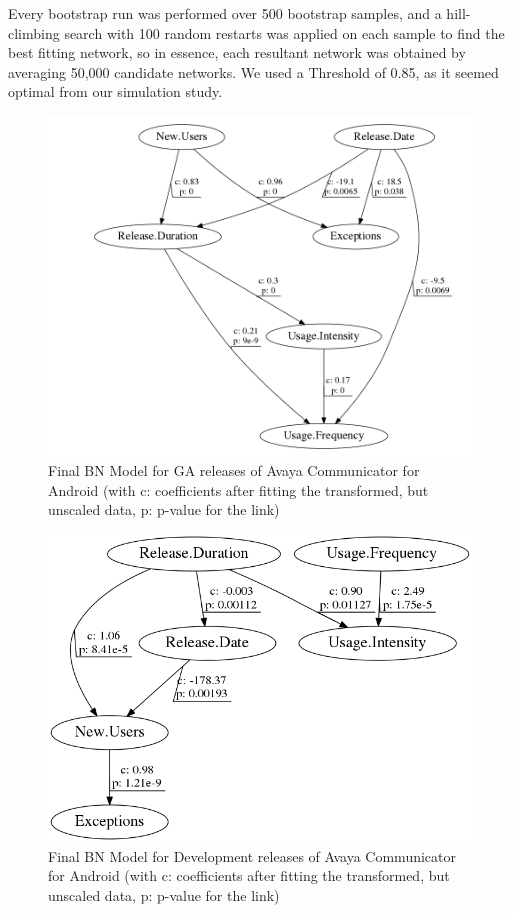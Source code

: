 \documentclass[smallextended]{svjour3}       %
\begin{document}
Every bootstrap run was performed over 500 bootstrap samples, and a
hill-climbing search  with 100 random restarts was applied on each sample 
to find the best fitting network, so in essence, each resultant network was 
obtained by averaging 50,000 candidate networks. We used a Threshold of 
0.85, as it seemed optimal from our simulation study.

\begin{figure}[!t]
\centering
\includegraphics[width=0.7\linewidth]{AGA}%
\caption{Final BN Model for GA releases of Avaya Communicator for Android (with c: coefficients after fitting the transformed, but unscaled data, p: p-value  for the link) }
\label{fig:finalAGA}
\vspace{-10pt}
\end{figure}

\begin{figure}[!t]
\centering
\includegraphics[width=0.7\linewidth]{AD}%
\caption{Final BN Model for Development releases of Avaya Communicator for Android (with c: coefficients after fitting the transformed, but unscaled data, p: p-value  for the link) }
\label{fig:finalAD}
\vspace{-10pt}
\end{figure}
\end{document}
